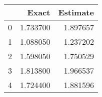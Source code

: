 \begin{tabular}{lrr}
\toprule
 & Exact & Estimate \\
\midrule
0 & 1.733700 & 1.897657 \\
1 & 1.088050 & 1.237202 \\
2 & 1.598050 & 1.750529 \\
3 & 1.813800 & 1.966537 \\
4 & 1.724400 & 1.881596 \\
\bottomrule
\end{tabular}
